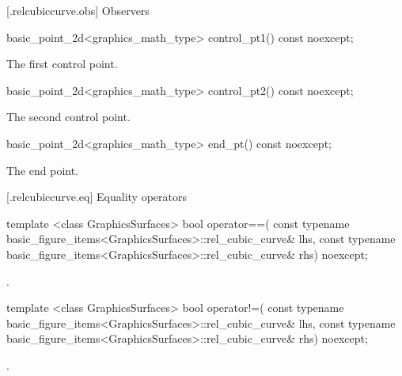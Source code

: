 [\iotwod.relcubiccurve.obs] {Observers}

%
\begin{itemdecl}
basic_point_2d<graphics_math_type> control_pt1() const noexcept;
\end{itemdecl}
\begin{itemdescr}
\pnum
\returns The first control point.
\end{itemdescr}

%
\begin{itemdecl}
basic_point_2d<graphics_math_type> control_pt2() const noexcept;
\end{itemdecl}
\begin{itemdescr}
\pnum
\returns The second control point.
\end{itemdescr}

%
\begin{itemdecl}
basic_point_2d<graphics_math_type> end_pt() const noexcept;
\end{itemdecl}
\begin{itemdescr}
\pnum
\returns The end point.
\end{itemdescr}

 [\iotwod.relcubiccurve.eq] {Equality operators}%

%
\begin{itemdecl}
template <class GraphicsSurfaces>
bool operator==(
  const typename basic_figure_items<GraphicsSurfaces>::rel_cubic_curve& lhs,
  const typename basic_figure_items<GraphicsSurfaces>::rel_cubic_curve& rhs) 
  noexcept;
\end{itemdecl}
\begin{itemdescr}
\pnum
\returns
{}.
\end{itemdescr}

%
\begin{itemdecl}
template <class GraphicsSurfaces>
bool operator!=(
  const typename basic_figure_items<GraphicsSurfaces>::rel_cubic_curve& lhs,
  const typename basic_figure_items<GraphicsSurfaces>::rel_cubic_curve& rhs) 
  noexcept;
\end{itemdecl}
\begin{itemdescr}
\pnum
\returns
{}.
\end{itemdescr}
